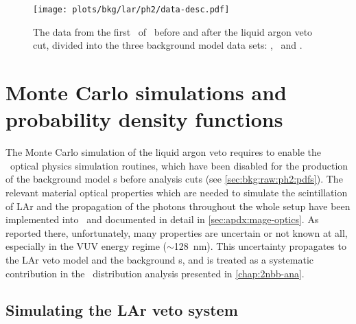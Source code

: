 \begin{figure}
  \centering
  \texttt{[image: plots/bkg/lar/ph2/data-desc.pdf]}
  \caption{%
    The data from the first \gexpophasetwobkg\ of \gerdatwo\ before and after the liquid argon veto
    cut, divided into the three background model data sets: \enrBEGeII, \enrCoaxII\ and
    \enrGeII.
  }\label{fig:bkg:lar:ph2:data-desc}
\end{figure}

\section{Monte Carlo simulations and probability density functions}%
\label{sec:bkg:lar:ph2:pdfs}

The Monte Carlo simulation of the liquid argon veto requires to enable the \geant\ optical
physics simulation routines, which have been disabled for the production of the background
model \pdf{}s before analysis cuts (see \cref{sec:bkg:raw:ph2:pdfs}). The relevant material
optical properties which are needed to simulate the scintillation of LAr and the
propagation of the photons throughout the whole setup have been implemented into \mage\
and documented in detail in \cref{sec:apdx:mage-optics}. As reported there, unfortunately,
many properties are uncertain or not known at all, especially in the VUV energy regime
($\sim$128~nm).  This uncertainty propagates to the LAr veto model and the background
\pdf{}s, and is treated as a systematic contribution in the \nnbb\ distribution analysis
presented in \cref{chap:2nbb-ana}.

\subsection{Simulating the LAr veto system}%
\label{sec:bkg:lar:ph2:heatmap}


